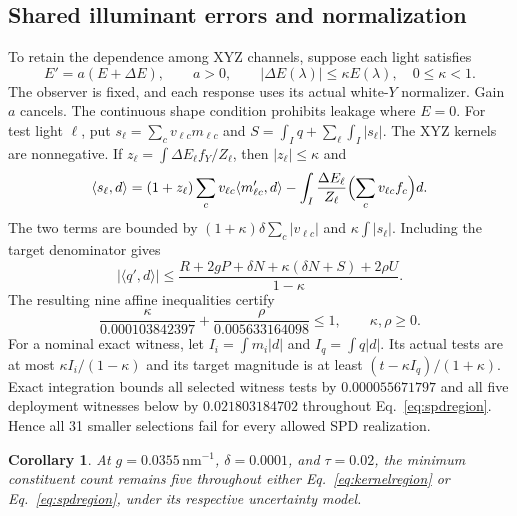 \documentclass{optica-article}
\newtheorem{corollary}[theorem]{Corollary}
\newcommand{\ip}[2]{\langle #1,#2\rangle}
\begin{document}
\subsection{Shared illuminant errors and normalization}
To retain the dependence among XYZ channels, suppose each light satisfies
\begin{equation}
 E'=a(E+\Delta E),\qquad a>0,\qquad
 |\Delta E(\lambda)|\leq\kappa E(\lambda),\quad0\leq\kappa<1. \label{eq:spd}
\end{equation}
The observer is fixed, and each response uses its actual white-$Y$ normalizer. Gain $a$ cancels. The continuous shape condition prohibits leakage where $E=0$. For test light $\ell$, put
$s_\ell=\sum_c v_{\ell c}m_{\ell c}$ and
$S=\int_I q+\sum_\ell\int_I|s_\ell|$.
The XYZ kernels are nonnegative. If $z_\ell=\int\Delta E_\ell f_Y/Z_\ell$, then $|z_\ell|\leq\kappa$ and
\begin{equation}
 \ip{s_\ell}d=(1+z_\ell)\sum_c v_{\ell c}\ip{m_{\ell c}'}d
 -\int_I\frac{\Delta E_\ell}{Z_\ell}\Bigl(\sum_c v_{\ell c}f_c\Bigr)d. \label{eq:block}
\end{equation}
The two terms are bounded by $(1+\kappa)\delta\sum_c|v_{\ell c}|$ and $\kappa\int|s_\ell|$. Including the target denominator gives
\begin{equation}
 |\ip{q'}d|\leq
 \frac{R+2gP+\delta N+\kappa(\delta N+S)+2\rho U}{1-\kappa}. \label{eq:spdrobust}
\end{equation}
The resulting nine affine inequalities certify
\begin{equation}
 \frac{\kappa}{0.000103842397}+\frac{\rho}{0.005633164098}\leq1,
 \qquad\kappa,\rho\geq0.                               \label{eq:spdregion}
\end{equation}
For a nominal exact witness, let $I_i=\int m_i|d|$ and $I_q=\int q|d|$. Its actual tests are at most $\kappa I_i/(1-\kappa)$ and its target magnitude is at least $(t-\kappa I_q)/(1+\kappa)$. Exact integration bounds all selected witness tests by $0.000055671797$ and all five deployment witnesses below by $0.021803184702$ throughout Eq.~\eqref{eq:spdregion}. Hence all 31 smaller selections fail for every allowed SPD realization.

\begin{corollary}\label{cor:robustcount}
At $g=0.0355\,\mathrm{nm}^{-1}$, $\delta=0.0001$, and $\tau=0.02$, the minimum constituent count remains five throughout either Eq.~\eqref{eq:kernelregion} or Eq.~\eqref{eq:spdregion}, under its respective uncertainty model.
\end{corollary}
\end{document}

